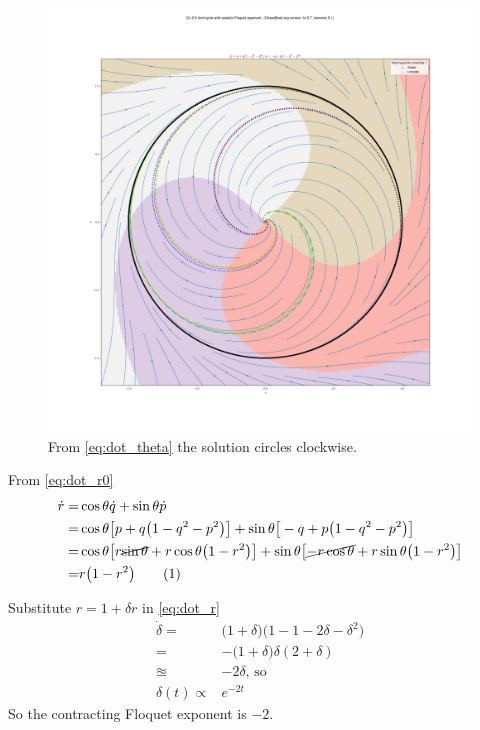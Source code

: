 \documentclass[]{article}
\newcommand\numberthis{\addtocounter{equation}{1}\tag{\theequation}}
\begin{document}
\begin{figure}[H]
	\caption{From \eqref{eq:dot_theta} the solution circles clockwise.}
	\includegraphics[width=\textwidth]{floquet.png}
\end{figure}
From \eqref{eq:dot_r0}
\begin{align*}
	\dot{r} =&	\cos{\theta} \dot{q} + \sin{\theta} \dot{p}\\
	=& 	\cos{\theta} \big[p + q\big(1-q^2-p^2\big)\big] + \sin{\theta} \big[-q + p\big(1-q^2-p^2\big)\big]\\
	=& 	\cos{\theta} \big[r \cancel{\sin{\theta}} + r \cos{\theta}\big(1-r^2\big)\big] + \sin{\theta} \big[\cancel{-r \cos{\theta}} + r \sin{\theta}\big(1-r^2\big)\big]\\
	=& r \big(1-r^2\big) \numberthis \label{eq:dot_r}
\end{align*}

Substitute $r=1+\delta r$ in \eqref{eq:dot_r}
\begin{align*}
	\dot{\delta} =& \big(1+\delta\big)\big(1 -1 -2 \delta - \delta^2\big)\\
	=& - \big(1+\delta\big) \delta (2 + \delta)\\
	\approxeq & - 2 \delta \text{, so}\\
	\delta(t) \propto & e^{-2 t}
\end{align*}
So the contracting Floquet exponent is $-2$.


\end{document}
